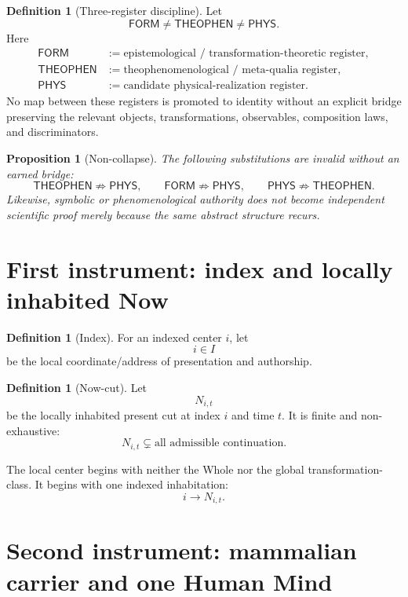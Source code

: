 \documentclass[10pt]{article}
\theoremstyle{pe}
\newtheorem{proposition}[theorem]{Proposition}
\theoremstyle{definition}
\newtheorem{definition}[theorem]{Definition}
\newcommand{\THEOPHEN}{\mathsf{THEOPHEN}}
\newcommand{\FORM}{\mathsf{FORM}}
\newcommand{\PHYS}{\mathsf{PHYS}}
\begin{document}
\begin{definition}[Three-register discipline]
Let
\[
  \FORM\neq\THEOPHEN\neq\PHYS.
\]
Here
\[
\begin{aligned}
\FORM &:= \text{epistemological / transformation-theoretic register},\\
\THEOPHEN &:= \text{theophenomenological / meta-qualia register},\\
\PHYS &:= \text{candidate physical-realization register}.
\end{aligned}
\]
No map between these registers is promoted to identity without an explicit bridge preserving the relevant objects, transformations, observables, composition laws, and discriminators.
\end{definition}

\begin{proposition}[Non-collapse]
The following substitutions are invalid without an earned bridge:
\[
\THEOPHEN\not\Rightarrow\PHYS,
\qquad
\FORM\not\Rightarrow\PHYS,
\qquad
\PHYS\not\Rightarrow\THEOPHEN.
\]
Likewise, symbolic or phenomenological authority does not become independent scientific proof merely because the same abstract structure recurs.
\end{proposition}

\section{First instrument: index and locally inhabited Now}

\begin{definition}[Index]
For an indexed center \(i\), let
\[
  i\in I
\]
be the local coordinate/address of presentation and authorship.
\end{definition}

\begin{definition}[Now-cut]
Let
\[
  N_{i,t}
\]
be the locally inhabited present cut at index \(i\) and time \(t\).  It is finite and non-exhaustive:
\[
  N_{i,t}\subsetneq \text{all admissible continuation}.
\]
\end{definition}

The local center begins with neither the Whole nor the global transformation-class.  It begins with one indexed inhabitation:
\[
  i\longrightarrow N_{i,t}.
\]

\section{Second instrument: mammalian carrier and one Human Mind}
\end{document}
